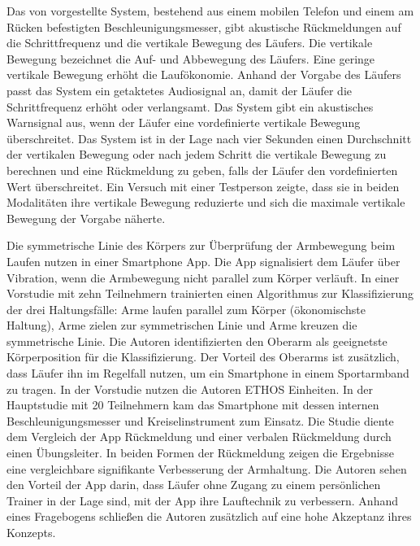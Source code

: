 Das von \citet{Eriksson2010} vorgestellte System, bestehend aus einem mobilen Telefon und einem am Rücken befestigten Beschleunigungsmesser, gibt akustische Rückmeldungen auf die Schrittfrequenz und die vertikale Bewegung des Läufers. Die vertikale Bewegung bezeichnet die Auf- und Abbewegung des Läufers. Eine geringe vertikale Bewegung erhöht die Laufökonomie. Anhand der Vorgabe des Läufers passt das System ein getaktetes Audiosignal an, damit der Läufer die Schrittfrequenz erhöht oder verlangsamt. Das System gibt ein akustisches Warnsignal aus, wenn der Läufer eine vordefinierte vertikale Bewegung überschreitet. Das System ist in der Lage nach vier Sekunden einen Durchschnitt der vertikalen Bewegung oder nach jedem Schritt die vertikale Bewegung zu berechnen und eine Rückmeldung zu geben, falls der Läufer den vordefinierten Wert überschreitet. Ein Versuch mit einer Testperson zeigte, dass sie in beiden Modalitäten ihre vertikale Bewegung reduzierte und sich die maximale vertikale Bewegung der Vorgabe näherte.

Die symmetrische Linie des Körpers zur Überprüfung der Armbewegung beim Laufen nutzen \citet{Strohrmann2013, Strohrmann2014} in einer Smartphone App. Die App signalisiert dem Läufer über Vibration, wenn die Armbewegung nicht parallel zum Körper verläuft. In einer Vorstudie mit zehn Teilnehmern trainierten \citet{Strohrmann2013} einen Algorithmus zur Klassifizierung der drei Haltungsfälle: Arme laufen parallel zum Körper (ökonomischste Haltung), Arme zielen zur symmetrischen Linie und Arme kreuzen die symmetrische Linie. Die Autoren identifizierten den Oberarm als geeignetste Körperposition für die Klassifizierung. Der Vorteil des Oberarms ist zusätzlich, dass Läufer ihn im Regelfall nutzen, um ein Smartphone in einem Sportarmband zu tragen. In der Vorstudie nutzen die Autoren ETHOS Einheiten. In der Hauptstudie mit 20 Teilnehmern kam das Smartphone mit dessen internen Beschleunigungsmesser und Kreiselinstrument zum Einsatz. Die Studie diente dem Vergleich der App Rückmeldung und einer verbalen Rückmeldung durch einen Übungsleiter. In beiden Formen der Rückmeldung zeigen die Ergebnisse eine vergleichbare signifikante Verbesserung der Armhaltung. Die Autoren sehen den Vorteil der App darin, dass Läufer ohne Zugang zu einem persönlichen Trainer in der Lage sind, mit der App ihre Lauftechnik zu verbessern. Anhand eines Fragebogens schließen die Autoren zusätzlich auf eine hohe Akzeptanz ihres Konzepts.

